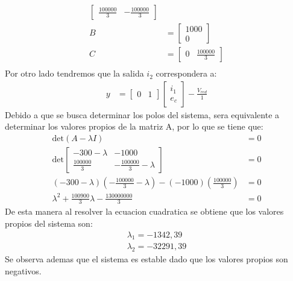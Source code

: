 \documentclass[
  11pt,
  letterpaper,
   addpoints,
   answers
  ]{exam}
\begin{document}
\begin{questions}
\begin{solution}
\begin{align}
\begin{bmatrix}
                \frac{100000}{3} & -\frac{100000}{3}
            \end{bmatrix}\\
            B &=
            \begin{bmatrix}
                1000\\
                0
            \end{bmatrix}\\
            C &=
            \begin{bmatrix}
                0 & \frac{100000}{3}
            \end{bmatrix}\\
        \end{align}
        Por otro lado tendremos que la salida $i_{2}$ correspondera a:
        \begin{align}
            y &=
            \begin{bmatrix}
                0 & 1
            \end{bmatrix}
            \begin{bmatrix}
                i_{1}\\
                e_{c}
            \end{bmatrix}
            -\frac{V_{red}}{1}
        \end{align}
        Debido a que se busca determinar los polos del sistema, sera equivalente a determinar los valores propios de la matriz A, por lo que se tiene que:
        \begin{align}
            \text{det}(A - \lambda I) &= 0\\
            \text{det}
            \begin{bmatrix}
                -300 - \lambda & -1000\\
                \frac{100000}{3} & -\frac{100000}{3} - \lambda
            \end{bmatrix}
            &= 0\\
            (-300 - \lambda)(-\frac{100000}{3} - \lambda) - (-1000)(\frac{100000}{3}) &= 0\\
            \lambda^{2} + \frac{100900}{3}\lambda - \frac{130000000}{3} &= 0
        \end{align}
        De esta manera al resolver la ecuacion cuadratica se obtiene que los valores propios del sistema son:
        \begin{align}
            \lambda_{1} =  - 1342,39\\
            \lambda_{2} =  -32291,39
        \end{align}
        Se observa ademas que el sistema es estable dado que los valores propios son negativos.

\end{solution}
\end{questions}
\end{document}
